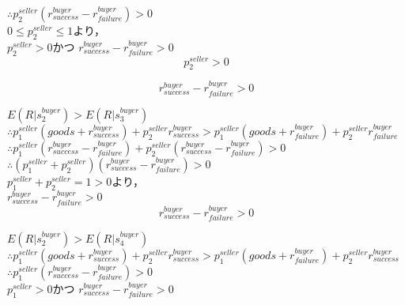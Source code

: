 $\therefore p^{seller}_2 (r^{buyer}_{success} - r^{buyer}_{failure}) > 0$\\

$0 \leq p^{seller}_2 \leq 1$より，\\

$p^{seller}_2 > 0$かつ
$r^{buyer}_{success} - r^{buyer}_{failure} > 0$\\

\begin{equation}
  p^{seller}_2 > 0
\end{equation}

\begin{equation}
  \label{quad2-1}
  r^{buyer}_{success} - r^{buyer}_{failure} > 0
\end{equation}

$ E(R|s^{buyer}_2) > E(R|s^{buyer}_3)$\\

$\therefore p^{seller}_1 (goods + r^{buyer}_{success}) + p^{seller}_2 r^{buyer}_{success} > p^{seller}_1 (goods + r^{buyer}_{failure}) + p^{seller}_2 r^{buyer}_{failure}$\\

$\therefore p^{seller}_1 (r^{buyer}_{success} - r^{buyer}_{failure}) + p^{seller}_2 (r^{buyer}_{success} - r^{buyer}_{failure}) > 0$\\

$\therefore (p^{seller}_1 + p^{seller}_2)(r^{buyer}_{success} - r^{buyer}_{failure}) > 0$\\

$ p^{seller}_1 + p^{seller}_2 = 1 > 0$より，\\

$ r^{buyer}_{success} - r^{buyer}_{failure} > 0$\\

\begin{equation}
  \label{quad2-2}
  r^{buyer}_{success} - r^{buyer}_{failure} > 0
\end{equation}

$ E(R|s^{buyer}_2) > E(R|s^{buyer}_4)$\\

$\therefore p^{seller}_1 (goods + r^{buyer}_{success}) + p^{seller}_2 r^{buyer}_{success} > p^{seller}_1 (goods + r^{buyer}_{failure}) + p^{seller}_2 r^{buyer}_{success}$\\

$\therefore p^{seller}_1(r^{buyer}_{success} - r^{buyer}_{failure}) > 0$\\

$ p^{seller}_1 > 0$かつ
$ r^{buyer}_{success} - r^{buyer}_{failure} > 0$\\

